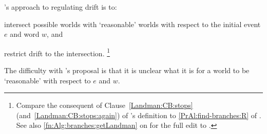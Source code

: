 \begin{note}
  \citeauthor{Landman:1992wh}'s approach to regulating drift is to:
  \begin{enumerate*}[label=\roman*., ref=(\roman*)]
  \item
    intersect possible worlds with `reasonable' worlds with respect to the initial event \(e\) and word \(w\), and
  \item
    restrict drift to the intersection.%
  \footnote{
    Compare the consequent of Clause~\ref{Landman:CB:stops} (and~\ref{Landman:CB:stops:again}) of \citeauthor{Landman:1992wh}'s definition to \autoref{PrAl:find-branches:R} of \AlgFindBranches{}.
    See also \autoref{fn:Alg:branches:getLandman} on  for the full edit to \AlgFindBranches{}.
  }
  \end{enumerate*}

  The difficulty with \citeauthor{Landman:1992wh}'s proposal is that it is unclear what it is for a world to be `reasonable' with respect to \(e\) and \(w\).


\end{note}
